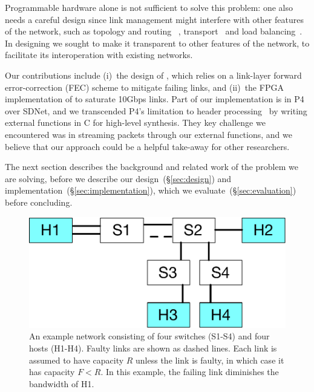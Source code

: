 Programmable hardware alone is not sufficient to solve this problem: one
also needs a careful design since link management might interfere with
other features of the network, such as topology and routing~
\cite{Greenberg:2011:VSF:1897852.1897877,
NiranjanMysore:2009:PSF:1594977.1592575,
Agarwal:2014:SMS:2620728.2620758},
transport~\cite{Raiciu:2011:IDP:2043164.2018467,Alizadeh:2010:DCT:1851275.1851192}
and load balancing~\cite{Alizadeh:2014:CDC:2740070.2626316}.
In designing \OurSys we sought to make it transparent to other
features of the network, to facilitate its interoperation with
existing networks.

Our contributions include (i)~the design of \OurSys, which relies on a
link-layer forward error-correction (FEC) scheme to mitigate failing
links, and (ii)~the FPGA implementation of \OurSys to saturate 10Gbps
links. Part of our implementation is in
P4~\cite{Bosshart:2014:PPP:2656877.2656890} over SDNet, and we
transcended P4's limitation to header processing~\cite{Dang:2017:WPL:3050220.3050231} by
writing external functions in C for high-level synthesis.
They key challenge we encountered was in streaming packets through our
external functions, and we believe that our approach could be a
helpful take-away for other researchers. 

The next section describes the background and related work of the problem we
are solving, before we describe our design~(\S\ref{sec:design}) and
implementation~(\S\ref{sec:implementation}), which we
evaluate~(\S\ref{sec:evaluation}) before concluding.

\begin{figure}
  \centering
  \includegraphics[width=0.3\paperwidth]{example_network.pdf}
  \caption{\label{fig:example-net}An example network consisting of four
    switches (S1-S4) and four hosts (H1-H4). Faulty links are shown as dashed lines.
    Each link is assumed to have capacity $R$ unless the link is faulty, in
    which case it has capacity $F < R$.  In this example, the failing link
    diminishes the bandwidth of H1.}
\end{figure}
